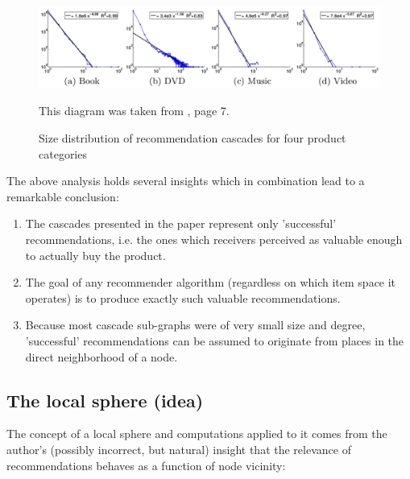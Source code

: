 		\begin{figure}[ht]
			\begin{center}
				\includegraphics[width=1\textwidth]{figures/rec_cascades_size_count}
				\caption{Size distribution of recommendation cascades for four product categories}
				\small
				This diagram was taken from \citep{RecCascades}, page 7.
				\label{fig:cascade_size_count}
			\end{center}
		\end{figure}
		
		The above analysis holds several insights which in combination lead to a remarkable conclusion:
		
		\begin{enumerate}
			\item The cascades presented in the paper represent only 'successful' recommendations, i.e. the ones which receivers perceived as valuable enough to actually buy the product.
			\item The goal of any recommender algorithm (regardless on which item space it operates) is to produce exactly such valuable recommendations.
			\item Because most cascade sub-graphs were of very small size and degree, 'successful' recommendations can be assumed to originate from places in the direct neighborhood of a node.
		\end{enumerate}
		
		
		\subsection{The local sphere (idea)}
		\label{ssect:the_local_sphere}
		
		The concept of a local sphere and computations applied to it comes from the author's (possibly incorrect, but natural) insight that the relevance of recommendations behaves as a function of node vicinity:
		

